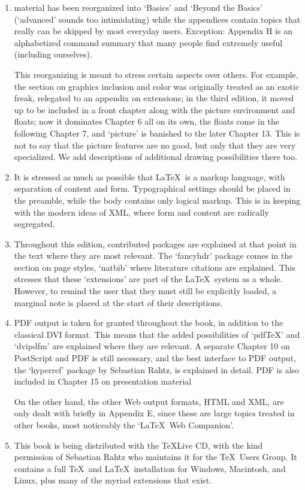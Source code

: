 \documentclass[twoside]{report}
\begin{document}
\begin{enumerate}
\item material has been reorganized into `Basics' and `Beyond the Basics'
  (`advanced' sounds too intimidating) while the appendices contain
  topics that really can be skipped by most everyday users. Exception:
  Appendix H is an alphabetized command summary that many
  people find extremely useful (including ourselves).

  This reorganizing is meant to stress certain aspects over others. For
  example, the section on graphics inclusion and color was originally
  treated as an exotic freak, relegated to an appendix on extensions; in the
  third edition, it moved up to be included in a front chapter along with the
  picture environment and floats; now it dominates
  Chapter 6 all on its own, the floats come in the following
  Chapter 7, and `picture' is banished to the later
  Chapter 13. This is not to say that the picture features are no good,
  but only that they are very specialized. We add
  descriptions of additional drawing possibilities there too.

\item It is stressed as much as possible that \LaTeX\ is a markup language,
  with separation of content and form. Typographical settings
  should be placed in the preamble, while the body contains only logical
  markup. This is in keeping with the modern ideas of XML, where form and
  content are radically segregated.

\item Throughout this edition, contributed packages are explained at that point
  in the text where they are most relevant. The `fancyhdr' package
  comes in the section on page styles, `natbib' where literature
  citations are explained. This stresses that these `extensions' are part of
  the \LaTeX\ system as a whole. However, to remind the user that they must
  still be explicitly loaded, a marginal note is placed at the start of their
  descriptions.

\item PDF output is taken for granted throughout the book, in addition to the
  classical DVI format. This means that the added possibilities of `pdf\TeX'
  and `dvipdfm' are explained where they are relevant. A separate
  Chapter 10 on PostScript and PDF is still necessary, and the
  best interface to PDF output, the `hyperref' package by Sebastian
  Rahtz, is explained in detail. PDF is also included in
  Chapter 15 on presentation material

  On the other hand, the other Web output formats, HTML and XML, are only
  dealt with briefly in Appendix E, since these are large topics
  treated in other books, most noticeably the `\LaTeX\ Web Companion'.

\item This book is being distributed with the \TeX Live CD, with the kind
  permission of Sebastian Rahtz who maintains it for the \TeX\ Users Group.
  It contains a full \TeX\ and \LaTeX\ installation for Windows, Macintosh,
  and Linux, plus many of the myriad extensions that exist.
\end{enumerate}
\end{document}
